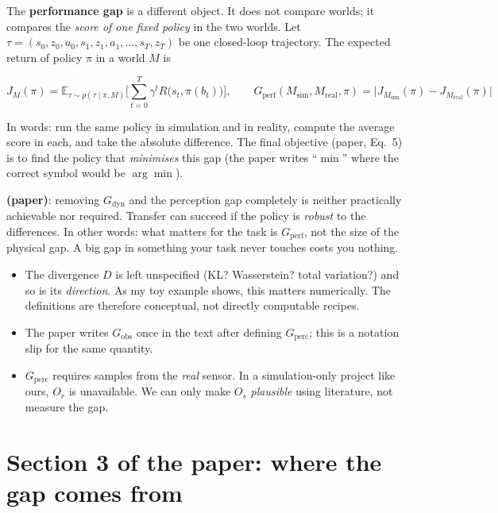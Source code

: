 \documentclass[11pt,a4paper]{article}
\newcommand{\Ms}{M_{\mathrm{sim}}}
\newcommand{\Mr}{M_{\mathrm{real}}}
\begin{document}
The \textbf{performance gap} is a different object. It does not compare worlds; it compares the
\emph{score of one fixed policy} in the two worlds. Let $\tau=(s_0,z_0,a_0,s_1,z_1,a_1,\dots,s_T,z_T)$
be one closed-loop trajectory. The expected return of policy $\pi$ in a world $M$ is
\begin{eqbox}
\[
J_M(\pi)=\mathbb E_{\tau\sim p(\tau\mid\pi,M)}\Big[\sum_{t=0}^{T}\gamma^{t}R\big(s_t,\pi(b_t)\big)\Big],\qquad
G_{\mathrm{perf}}(\Ms,\Mr,\pi)=\big|J_{\Ms}(\pi)-J_{\Mr}(\pi)\big|
\]
\end{eqbox}
In words: run the same policy in simulation and in reality, compute the average score in each, and
take the absolute difference. The final objective (paper, Eq.~5) is to find the policy that
\emph{minimises} this gap (the paper writes ``$\min$'' where the correct symbol would be
$\arg\min$).

\begin{idea}
\textbf{(paper)}: removing $G_{\mathrm{dyn}}$ and the perception gap completely is neither
practically achievable nor required. Transfer can succeed if the policy is \emph{robust} to the
differences. In other words: what matters for the task is $G_{\mathrm{perf}}$, not the size of the
physical gap. A big gap in something your task never touches costs you nothing.
\end{idea}

\begin{warn}
\begin{itemize}
\item The divergence $D$ is left unspecified (KL? Wasserstein? total variation?) and so is its
\emph{direction}. As my toy example shows, this matters numerically. The definitions are therefore
conceptual, not directly computable recipes.
\item The paper writes $G_{\mathrm{obs}}$ once in the text after defining $G_{\mathrm{perc}}$; this is
a notation slip for the same quantity.
\item $G_{\mathrm{perc}}$ requires samples from the \emph{real} sensor. In a simulation-only project
like ours, $O_r$ is unavailable. We can only make $O_s$ \emph{plausible} using literature, not
measure the gap.
\end{itemize}
\end{warn}

\section{Section 3 of the paper: where the gap comes from}
\end{document}
